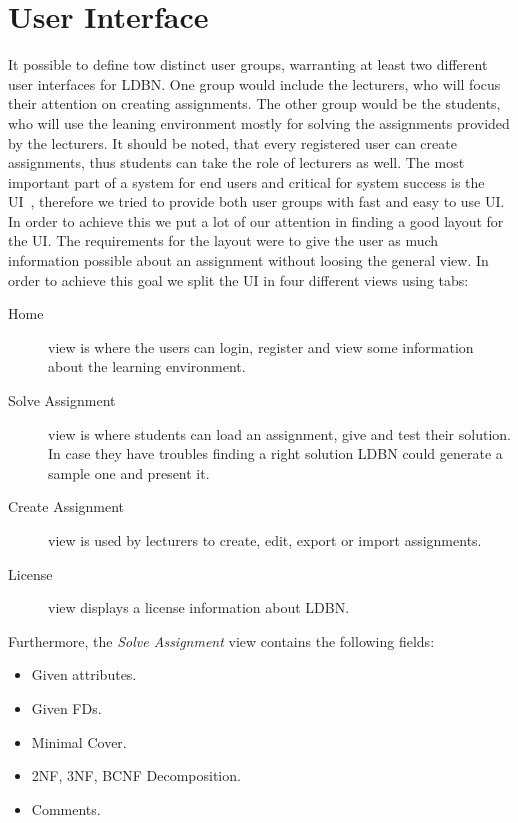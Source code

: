 \section{User Interface}
It possible to define tow distinct user groups, warranting at least two different
user interfaces for LDBN.  One group would include the lecturers, who will
focus their attention on creating assignments. The other group would be the 
students, who will use the leaning environment mostly for solving 
the assignments provided by the lecturers. It should be noted, that every registered
user can create assignments, thus students can take the role of lecturers as well.
The most important part of a system for end users and critical for system 
success is the UI~\cite{p9}, therefore we tried to provide both 
user groups with fast and easy to use UI. In order to achieve this we put a lot
of our attention in finding a good layout for the UI. The requirements for
the layout were to give the user as much information possible about an 
assignment without loosing the general view. In order to achieve this goal  
we split the UI in four different views using tabs:

\begin{description}
	\item[Home] view is where the users can login, register and view some information 
	about the learning environment.
	\item[Solve Assignment] view is where students can load an assignment, give and
	test their solution. In case they have troubles finding a right solution
	LDBN could generate a sample one and present it.  
	\item[Create Assignment] view is used by lecturers to create, edit, export or import
	assignments.  
	\item[License] view displays a license information about LDBN.
\end{description} 

Furthermore, the \textit{Solve Assignment} view contains the following fields:

\begin{itemize}
	\item Given attributes.
	\item Given FDs.
	\item Minimal Cover.
	\item 2NF, 3NF, BCNF Decomposition.
	\item Comments.
\end{itemize}

